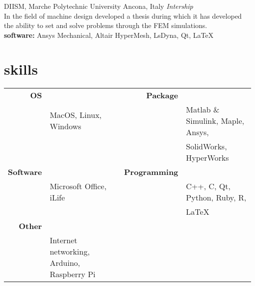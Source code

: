 \documentclass[]{friggeri-cv} %
\begin{document}
\begin{entrylist}

{DIISM, Marche Polytechnic University}
{Ancona, Italy}
{\emph{Intership}\\
In the field of machine design developed a thesis during which it
has developed the ability to set and solve problems through the FEM simulations.\\
\textbf{software: } Ansys Mechanical, Altair  HyperMesh, LsDyna, Qt, \LaTeX \quad
\href{https://github.com/frank1789/LsDynaToAPDL}{\faGithub}
}


\end{entrylist}


\pagebreak
\section{skills}

\begin{tabular}{rlrl}
\textbf{OS} && \textbf{Package}\\
& MacOS, Linux, Windows  &&  Matlab \& Simulink, Maple, Ansys,\\ &&& SolidWorks, HyperWorks \\
\textbf{Software} && \textbf{Programming}\\
&Microsoft Office, iLife &&  C++,  C, Qt, Python, Ruby, R, \\ &&&\LaTeX{} \\
\textbf{Other}\\
&Internet networking, Arduino, Raspberry Pi\\
\end{tabular}\\


%
%
%

\end{document}
